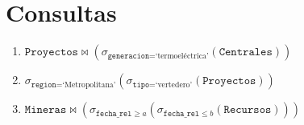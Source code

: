 \documentclass{article}
\begin{document}
\section{Consultas}

\begin{enumerate}
	\item $\texttt{Proyectos} \bowtie (\sigma_{\texttt{generacion} = \text{`termoeléctrica'}}(\texttt{Centrales}))$ 
	\item $\sigma_{\texttt{region} = \text{`Metropolitana'}}(\sigma_{\texttt{tipo} = \text{`vertedero'}}(\texttt{Proyectos}))$ 
	\item $\texttt{Mineras} \bowtie (\sigma_{\texttt{fecha\_rel} \geq a}(\sigma_{\texttt{fecha\_rel} \leq b}(\texttt{Recursos})))$  
\end{enumerate}
\end{document}
